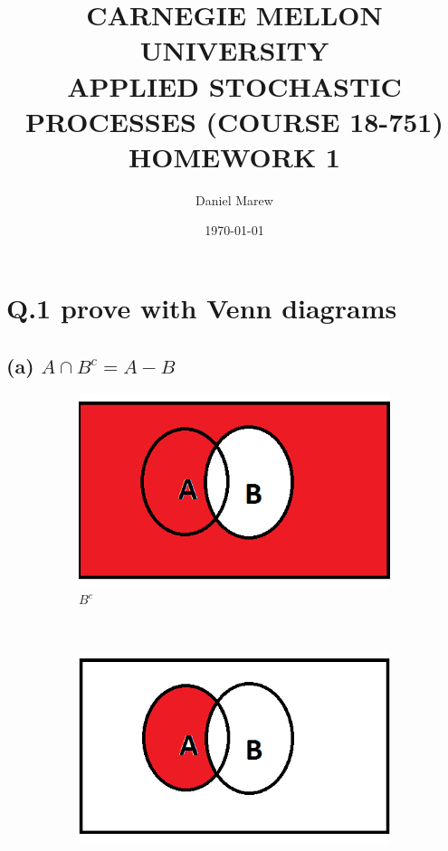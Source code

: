 \documentclass[a4paper,11pt]{report}
\begin{document}
\title{\color{red}CARNEGIE MELLON UNIVERSITY\\
APPLIED STOCHASTIC PROCESSES  (COURSE 18-751)\\
HOMEWORK 1}
\author{Daniel Marew}
\date{\today}
\maketitle
\newpage
\section*{Q.1 prove with Venn diagrams}
\subsection*{(a) $A \cap B^c = A-B$}
\begin{figure}[h]
    \centering
    \begin{subfigure}[b]{0.25\textwidth}
        \includegraphics[width=\textwidth]{BC}
        \caption{$B^c$}
    \end{subfigure}
 ~
    \begin{subfigure}[b]{0.25\textwidth}
        \includegraphics[width=\textwidth]{AnBc}

\end{subfigure}
\end{figure}
\end{document}
